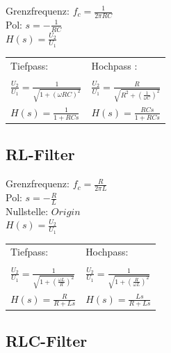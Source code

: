 	
		\begin{emphbox}
			Grenzfrequenz: $ f_c = \frac{1}{2 \pi RC} $ \\
			Pol: $ s = - \frac{1}{RC} $ \\
			$ H(s) = \frac{U_2}{U_1} $ \\

			\begin{tabular}{l|l}
				Tiefpass: & Hochpass : \\
				 & 
				 \\
				$ \frac{U_2}{U_1} = \frac{1}{\sqrt{1+(\omega RC)^2}} $ &
				$ \frac{U_2}{U_1} = \frac{R}{\sqrt{R^2+(\frac{1}{\omega C})^2}} $ \\
				$ H(s) = \frac{1}{1 + RCs} $ &
				$ H(s) = \frac{RCs}{1 + RCs} $
			\end{tabular}
		\end{emphbox}

	\subsection{RL-Filter}

		\begin{emphbox}
			Grenzfrequenz: $ f_c = \frac{R}{2 \pi L} $ \\
			Pol: $ s = - \frac{R}{L} $ \\
			Nullstelle: $ Origin $	\\
			$ H(s) = \frac{U_2}{U_1} $ \\
			
			\begin{tabular}{l|l}
				Tiefpass: & Hochpass: \\
				 & 
				 \\
				$ \frac{U_2}{U_1} = \frac{1}{\sqrt{1+(\frac{\omega L}{R})^2}} $ &
				$ \frac{U_2}{U_1} = \frac{1}{\sqrt{1+(\frac{R}{\omega L})^2}} $ \\
				$ H(s) = \frac{R}{R + Ls} $ &
				$ H(s) = \frac{Ls}{R + Ls} $
			\end{tabular}
		\end{emphbox}



	\subsection{RLC-Filter}

